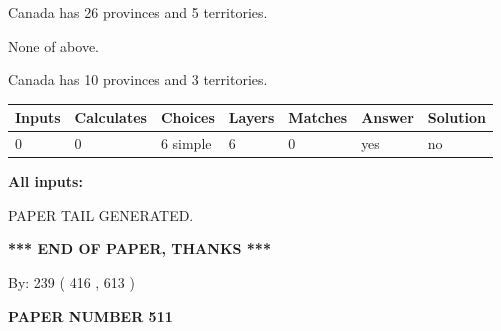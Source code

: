 \documentclass[12pt]{article}
\begin{document}
 
Canada has  26 provinces and  5 territories.
 
 
 None of above.
 
 
\noindent{}
 
 
Canada has 10  provinces and 3 territories.
 
 
\noindent{}
 
 
   
   
   
   
\noindent\begin{tabular}{|l|l|l|l|l|l|l|}
 \hline
Inputs & Calculates & Choices & Layers & Matches & Answer & Solution \\ \hline
 0  & 
 0  & 
 6
  simple  
  & 
 6  & 
 0  & 
  yes & 
  no 
  \\ \hline
 \end{tabular}
   
   
   
   
\noindent{}
   
   
   
   
\noindent\vspace{0.1in}\hspace{-0.08in} {\textbf{\Large{All inputs: }}}
   
   
   
   
   
   
 \vspace{0.2in}
 
   
   
\vspace{2.0in} PAPER TAIL GENERATED.
   
   
   
   
\vspace{1.0in} 
{\textbf{\large{ *** END OF PAPER, THANKS *** }}} 
   
   
\hspace{1.0in} By: 
 239 ( 416 ,  613 )
   
   
   
   
\newpage 
\setcounter{page}{ 
   511001 } 
   
   
   
   
 {\textbf{ \Large{ PAPER NUMBER  511  }}}
   
\end{document}
